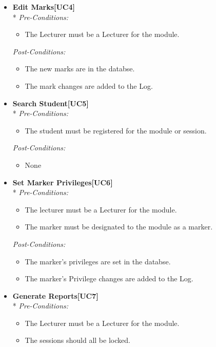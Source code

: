 \documentclass[a4paper]{article}
\begin{document}
\begin{itemize}
				\item	\textbf{Edit Marks[UC4]}\\*
						\textit{Pre-Conditions:}
								\begin{itemize}
									\item The Lecturer must be a Lecturer for the module.
								\end{itemize}
								
						\textit{Post-Conditions:}
								\begin{itemize}
									\item The new marks are in the databse.
									\item The mark changes are added to the Log.
								\end{itemize}
														
				\item	\textbf{Search Student[UC5]}\\*
						\textit{Pre-Conditions:}
								\begin{itemize}
									\item The student must be registered for the module or session.
								\end{itemize}
								
						\textit{Post-Conditions:}
								\begin{itemize}
									\item None
								\end{itemize}
														
				\item	\textbf{Set Marker Privileges[UC6]}\\*
						\textit{Pre-Conditions:}
								\begin{itemize}
									\item The lecturer must be a Lecturer for the module.
									\item The marker must be designated to the module as a marker.
								\end{itemize}
								
						\textit{Post-Conditions:}
								\begin{itemize}
									\item The marker's privileges are set in the databse.
									\item The marker's Privilege changes are added to the Log.
								\end{itemize}
														
				\item	\textbf{Generate Reports[UC7]}\\*
						\textit{Pre-Conditions:}
								\begin{itemize}
									\item The Lecturer must be a Lecturer for the module.
									\item The sessions should all be locked.
								\end{itemize}
								

\end{itemize}
\end{document}
